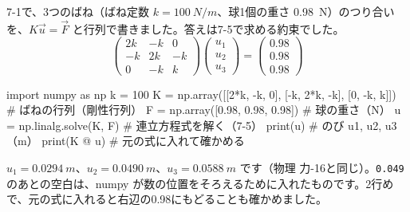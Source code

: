 7-1で、3つのばね（ばね定数 $k=\qty{100}{N/m}$、球1個の重さ \qty{0.98}{N}）のつり合いを、$K\vec u=\vec F$ と行列で書きました。答えは7-5で求める約束でした。
\[ \begin{pmatrix}2k&-k&0\\-k&2k&-k\\0&-k&k\end{pmatrix}\begin{pmatrix}u_1\\u_2\\u_3\end{pmatrix}=\begin{pmatrix}0.98\\0.98\\0.98\end{pmatrix} \]
\begin{bkcode}[Python]
import numpy as np
k = 100
K = np.array([[2*k, -k, 0],
              [-k, 2*k, -k],
              [0, -k, k]])           \# ばねの行列（剛性行列）
F = np.array([0.98, 0.98, 0.98])     \# 球の重さ（N）
u = np.linalg.solve(K, F)            \# 連立方程式を解く（7-5）
print(u)                             \# のび u1, u2, u3（m）
print(K @ u)                         \# 元の式に入れて確かめる
\end{bkcode}
\begin{bkcodeout}[実行結果]
[0.0294 0.049  0.0588]
[0.98 0.98 0.98]
\end{bkcodeout}
$u_1=\qty{0.0294}{m}$、$u_2=\qty{0.0490}{m}$、$u_3=\qty{0.0588}{m}$ です（物理 力-16と同じ）。\texttt{0.049} のあとの空白は、numpy が数の位置をそろえるために入れたものです。2行めで、元の式に入れると右辺の0.98にもどることも確かめました。


